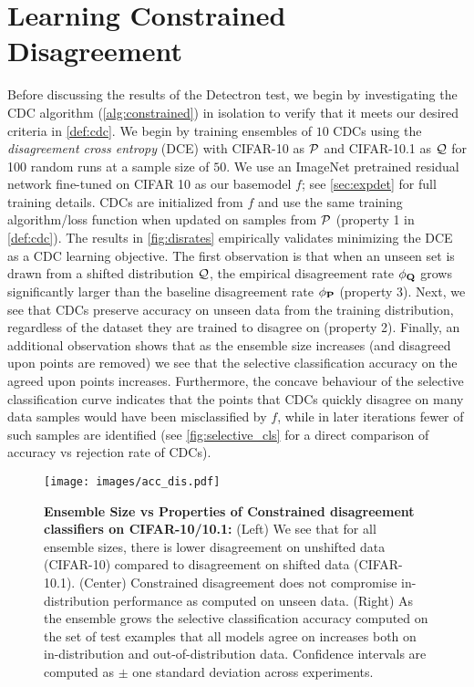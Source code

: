 \section{Learning Constrained Disagreement}
Before discussing the results of the Detectron test, we begin by investigating the CDC algorithm (\autoref{alg:constrained}) in isolation to verify that it meets our desired criteria in \autoref{def:cdc}.
We begin by training ensembles of $10$ CDCs using the \textit{disagreement cross entropy} (DCE) with CIFAR-10 as $\mathcal{P}$ and CIFAR-10.1 as $\mathcal{Q}$ for 100 random runs at a sample size of $50$.
We use an ImageNet pretrained residual network fine-tuned on CIFAR 10 as our basemodel $f$; see \autoref{sec:expdet} for full training details.
CDCs are initialized from $f$ and use the same training algorithm/loss function when updated on samples from $\mathcal{P}$ (property 1 in \autoref{def:cdc}).
The results in \autoref{fig:disrates} empirically validates minimizing the DCE as a CDC learning objective.
The first observation is that when an unseen set is drawn from a shifted distribution $\mathcal{Q}$, the empirical disagreement rate $\phi_{\mathbf{Q}}$ grows significantly larger
than the baseline disagreement rate $\phi_{\mathbf{P}}$ (property 3).
Next, we see that CDCs preserve accuracy on unseen data from the training distribution, regardless of the dataset they are trained to disagree on (property 2).
Finally, an additional observation shows that as the ensemble size increases (and disagreed upon points are removed) we see that the selective classification accuracy on the agreed upon points increases.
Furthermore, the concave behaviour of the selective classification curve indicates that the points that CDCs quickly disagree on many data samples would have been misclassified by $f$,
while in later iterations fewer of such samples are identified (see \autoref{fig:selective_cls} for a direct comparison of accuracy vs rejection rate of CDCs).

\begin{figure}[!htb]
    \centering
    \texttt{[image: images/acc\_dis.pdf]}
    \caption{\small \textbf{Ensemble Size vs Properties of Constrained disagreement classifiers on CIFAR-10/10.1:}
    (Left) We see that for all ensemble sizes, there is lower disagreement on unshifted data (CIFAR-10) compared to disagreement on shifted data (CIFAR-10.1).
        (Center) Constrained disagreement does not compromise in-distribution performance as computed on unseen data.
        (Right) As the ensemble grows the selective classification accuracy computed on the set of test examples that all models agree on increases both on in-distribution and out-of-distribution data.
        Confidence intervals are computed as $\pm$ one standard deviation across experiments.}
    \label{fig:disrates}
\end{figure}


